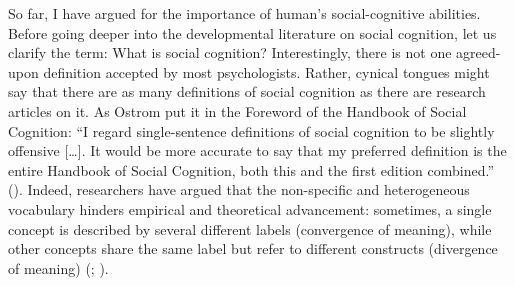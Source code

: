 \documentclass[
]{scrbook}
\begin{document}
So far, I have argued for the importance of human's social-cognitive abilities. Before going deeper into the developmental literature on social cognition, let us clarify the term: What is social cognition? Interestingly, there is not one agreed-upon definition accepted by most psychologists. Rather, cynical tongues might say that there are as many definitions of social cognition as there are research articles on it. As Ostrom put it in the Foreword of the Handbook of Social Cognition: ``I regard single-sentence definitions of social cognition to be slightly offensive {[}\ldots{]}. It would be more accurate to say that my preferred definition is the entire Handbook of Social Cognition, both this and the first edition combined.'' (). Indeed, researchers have argued that the non-specific and heterogeneous vocabulary hinders empirical and theoretical advancement: sometimes, a single concept is described by several different labels (convergence of meaning), while other concepts share the same label but refer to different constructs (divergence of meaning) (; ).
\end{document}
